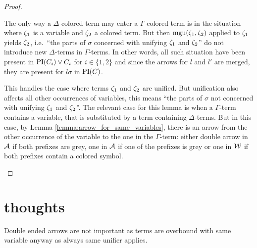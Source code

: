 \documentclass[,%
	paper=a4,%
	DIV12, %
	twoside=false,%
	liststotoc,
	bibtotoc,
	draft=false,%
	numbers=noendperiod
]{scrartcl}
\begin{document}
\begin{proof}
\begin{itemize}
\begin{enumerate}
					The only way a $\Delta$-colored term may enter a $\Gamma$-colored term is in the situation where $\zeta_{1}$ is a variable and $\zeta_{2}$ a colored term.
					But then $\operatorname{mgu}(\zeta_{1}, \zeta_{2})$ applied to $\zeta_{1}$ yields $\zeta_{2}$, i.e.~``the parts of $\sigma$ concerned with unifying $\zeta_{1}$ and $\zeta_{2}$'' do not introduce new $\Delta$-terms in $\Gamma$-terms.
					In other words, all such situation have been present in $\operatorname{PI}(C_i) \lor C_i$ for $i \in \{1,2\}$ and since the arrows for $l$ and $l'$ are merged, they are present for $l\sigma$ in $\operatorname{PI}(C)$.

					This handles the case where terms $\zeta_{1}$ and $\zeta_{2}$ are unified. 
					But unification also affects all other occurrences of variables, this means ``the parts of $\sigma$ not concerned with unifying $\zeta_{1}$ and $\zeta_{2}$''.
					The relevant case for this lemma is when a $\Gamma$-term contains a variable, that is substituted by a term containing $\Delta$-terms.
					But in this case, by Lemma \ref{lemma:arrow_for_same_variables}, there is an arrow from the other occurrence of the variable to the one in the $\Gamma$-term: either double arrow in $\operatorname{\mathcal{A}}$ if both prefixes are grey, one in $\operatorname{\mathcal{A}}$ if one of the prefixes is grey or one in $\operatorname{\mathcal{W}}$ if both prefixes contain a colored symbol.
					\qedhere
			\end{enumerate}
	\end{itemize}
\end{proof}

\clearpage
\section{thoughts}

\begin{conj}
	Double ended arrows are not important as terms are overbound with same variable anyway as always same unifier applies.
\end{conj}
\end{document}
